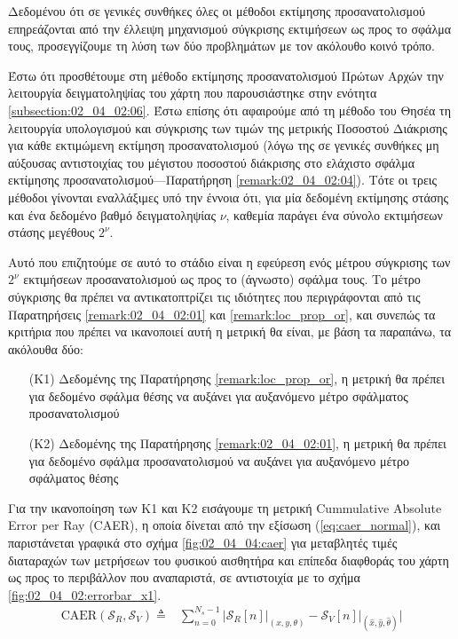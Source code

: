 Δεδομένου ότι σε γενικές συνθήκες όλες οι μέθοδοι εκτίμησης προσανατολισμού
επηρεάζονται από την έλλειψη μηχανισμού σύγκρισης εκτιμήσεων ως προς το σφάλμα
τους, προσεγγίζουμε τη λύση των δύο προβλημάτων με τον ακόλουθο κοινό τρόπο.

Έστω ότι προσθέτουμε στη μέθοδο εκτίμησης προσανατολισμού Πρώτων Αρχών την
λειτουργία δειγματοληψίας του χάρτη που παρουσιάστηκε στην ενότητα
\ref{subsection:02_04_02:06}. Έστω επίσης ότι αφαιρούμε από τη μέθοδο του Θησέα
τη λειτουργία υπολογισμού και σύγκρισης των τιμών της μετρικής Ποσοστού
Διάκρισης για κάθε εκτιμώμενη εκτίμηση προσανατολισμού (λόγω της σε γενικές
συνθήκες μη αύξουσας αντιστοιχίας του μέγιστου ποσοστού διάκρισης στο ελάχιστο
σφάλμα εκτίμησης προσανατολισμού---Παρατήρηση \ref{remark:02_04_02:04}). Τότε
οι τρεις μέθοδοι γίνονται εναλλάξιμες υπό την έννοια ότι, για μία δεδομένη
εκτίμησης στάσης και ένα δεδομένο βαθμό δειγματοληψίας $\nu$, καθεμία παράγει
ένα σύνολο εκτιμήσεων στάσης μεγέθους $2^\nu$.

Αυτό που επιζητούμε σε αυτό το στάδιο είναι η εφεύρεση ενός μέτρου σύγκρισης
των $2^\nu$ εκτιμήσεων προσανατολισμού ως προς το (άγνωστο) σφάλμα τους. Το
μέτρο σύγκρισης θα πρέπει να αντικατοπτρίζει τις ιδιότητες που περιγράφονται
από τις Παρατηρήσεις \ref{remark:02_04_02:01} και \ref{remark:loc_prop_or},
και συνεπώς τα κριτήρια που πρέπει να ικανοποιεί αυτή η μετρική θα είναι, με
βάση τα παραπάνω, τα ακόλουθα δύο:

\begin{itemize}
  \item[(K1)] Δεδομένης της Παρατήρησης \ref{remark:loc_prop_or}, η μετρική θα
        πρέπει για δεδομένο σφάλμα θέσης να αυξάνει για αυξανόμενο μέτρο
        σφάλματος προσανατολισμού
  \item[(K2)] Δεδομένης της Παρατήρησης \ref{remark:02_04_02:01}, η μετρική θα
        πρέπει για δεδομένο σφάλμα προσανατολισμού να αυξάνει για αυξανόμενο
        μέτρο σφάλματος θέσης
\end{itemize}

Για την ικανοποίηση των Κ1 και Κ2 εισάγουμε τη μετρική Cummulative Absolute
Error per Ray (CAER), η οποία δίνεται από την εξίσωση (\ref{eq:caer_normal}),
και παριστάνεται γραφικά στο σχήμα \ref{fig:02_04_04:caer} για μεταβλητές τιμές
διαταραχών των μετρήσεων του φυσικού αισθητήρα και επίπεδα διαφθοράς του χάρτη
ως προς το περιβάλλον που αναπαριστά, σε αντιστοιχία με το σχήμα
\ref{fig:02_04_02:errorbar_x1}.
\begin{align}
  \text{CAER}(\mathcal{S}_R, \mathcal{S}_V) \triangleq & \sum\limits_{n=0}^{N_s-1} \Bigg|
    \mathcal{S}_R[n]\Big|_{(x, y, \theta)} -
    \mathcal{S}_V[n]\Big|_{(\hat{x}, \hat{y}, \hat{\theta})} \Bigg|
  \label{eq:caer_normal}
\end{align}

